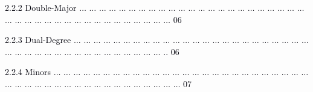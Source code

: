 \documentclass[12pt]{article}
\begin{document}
\vspace{\baselineskip}
\begin{adjustwidth}{0.5in}{0.0in}
{\fontsize{7pt}{8.4pt}\selectfont \textcolor[HTML]{00000A}{2.2.2 Double-Major $ \ldots $ $ \ldots $ $ \ldots $ $ \ldots $ $ \ldots $ $ \ldots $ $ \ldots $ $ \ldots $ $ \ldots $ $ \ldots $ $ \ldots $ $ \ldots $ $ \ldots $ $ \ldots $ $ \ldots $ $ \ldots $ $ \ldots $ $ \ldots $ $ \ldots $ $ \ldots $ $ \ldots $ $ \ldots $ $ \ldots $ $ \ldots $ $ \ldots $ $ \ldots $ $ \ldots $ $ \ldots $ $ \ldots $ $ \ldots $ $ \ldots $ $ \ldots $ $ \ldots $ $ \ldots $ $ \ldots $ $ \ldots $ $ \ldots $ $ \ldots $ $ \ldots $ $ \ldots $  06}\par}\par

\end{adjustwidth}


\vspace{\baselineskip}
\begin{adjustwidth}{0.5in}{0.0in}
{\fontsize{7pt}{8.4pt}\selectfont \textcolor[HTML]{00000A}{2.2.3 Dual-Degree $ \ldots $ $ \ldots $ $ \ldots $ $ \ldots $ $ \ldots $ $ \ldots $ $ \ldots $ $ \ldots $ $ \ldots $ $ \ldots $ $ \ldots $ $ \ldots $ $ \ldots $ $ \ldots $ $ \ldots $ $ \ldots $ $ \ldots $ $ \ldots $ $ \ldots $ $ \ldots $ $ \ldots $ $ \ldots $ $ \ldots $ $ \ldots $ $ \ldots $ $ \ldots $ $ \ldots $ $ \ldots $ $ \ldots $ $ \ldots $ $ \ldots $ $ \ldots $ $ \ldots $ $ \ldots $ $ \ldots $ $ \ldots $ $ \ldots $ $ \ldots $ $ \ldots $ $ \ldots $ .. 06}\par}\par

\end{adjustwidth}


\vspace{\baselineskip}
\begin{adjustwidth}{0.5in}{0.0in}
{\fontsize{7pt}{8.4pt}\selectfont \textcolor[HTML]{00000A}{2.2.4 Minors $ \ldots $ $ \ldots $ $ \ldots $ $ \ldots $ $ \ldots $ $ \ldots $ $ \ldots $ $ \ldots $ $ \ldots $ $ \ldots $ $ \ldots $ $ \ldots $ $ \ldots $ $ \ldots $ $ \ldots $ $ \ldots $ $ \ldots $ $ \ldots $ $ \ldots $ $ \ldots $ $ \ldots $ $ \ldots $ $ \ldots $ $ \ldots $ $ \ldots $ $ \ldots $ $ \ldots $ $ \ldots $ $ \ldots $ $ \ldots $ $ \ldots $ $ \ldots $ $ \ldots $ $ \ldots $ $ \ldots $ $ \ldots $ $ \ldots $ $ \ldots $ $ \ldots $ $ \ldots $ $ \ldots $ $ \ldots $ $ \ldots $ $ \ldots $  07}\par}\par

\end{adjustwidth}
\end{document}
